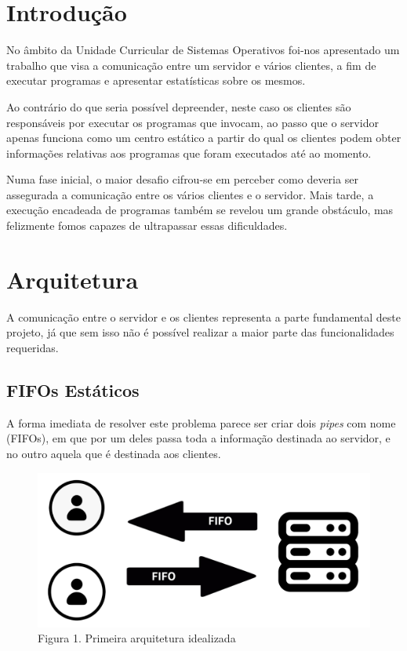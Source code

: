 \documentclass[12pt,a4paper]{report}
\begin{document}


\tableofcontents

\chapter{Introdução}

    No âmbito da Unidade Curricular de Sistemas Operativos foi-nos apresentado um trabalho que visa a comunicação entre um servidor e vários clientes, a fim de executar programas e apresentar estatísticas sobre os mesmos.

    Ao contrário do que seria possível depreender, neste caso os clientes são responsáveis por executar os programas que invocam, ao passo que o servidor apenas funciona como um centro estático a partir do qual os clientes podem obter informações relativas aos programas que foram executados até ao momento.

    Numa fase inicial, o maior desafio cifrou-se em perceber como deveria ser assegurada a comunicação entre os vários clientes e o servidor. Mais tarde, a execução encadeada de programas também se revelou um grande obstáculo, mas felizmente fomos capazes de ultrapassar essas dificuldades.


\chapter{Arquitetura}

    A comunicação entre o servidor e os clientes representa a parte fundamental deste projeto, já que sem isso não é possível realizar a maior parte das funcionalidades requeridas.

    \section{FIFOs Estáticos}

        A forma imediata de resolver este problema parece ser criar dois \textit{pipes} com nome (FIFOs), em que por um deles passa toda a informação destinada ao servidor, e no outro aquela que é destinada aos clientes.

        \begin{figure}[hb!]
            \centering
            \includegraphics{images/arq1.png}
            \caption*{Figura 1. Primeira arquitetura idealizada}
            \label{fig:Arq1}
        \end{figure}
\end{document}
